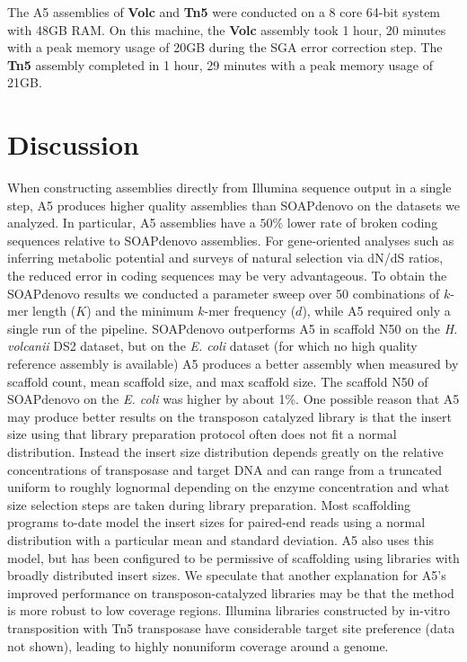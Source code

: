 \documentclass[10pt]{article}
\begin{document}
The A5 assemblies of \textbf{Volc} and \textbf{Tn5} were conducted on a 8 core 64-bit system with 48GB RAM. On this machine, the \textbf{Volc} assembly took 1 hour, 20 minutes with a peak memory usage of 20GB during the SGA error correction step. The \textbf{Tn5} assembly completed in 1 hour, 29 minutes with a peak memory usage of 21GB.

\section*{Discussion}

When constructing assemblies directly from Illumina sequence output in a single step, A5 produces higher quality assemblies 
than SOAPdenovo on the datasets we analyzed. 
In particular, A5 assemblies have a $50\%$ lower rate of broken coding sequences relative to SOAPdenovo assemblies.
For gene-oriented analyses such as inferring metabolic potential and surveys of natural selection via dN/dS ratios, the reduced error in coding sequences may be very advantageous.
 To obtain the SOAPdenovo results we conducted a parameter sweep 
over 50 combinations of $k$-mer length ($K$) and the minimum $k$-mer frequency ($d$), while A5 required
only a single run of the pipeline.
SOAPdenovo outperforms A5 in scaffold N50 on the \textit{H. volcanii} DS2 dataset, but on the \textit{E. coli} dataset 
(for which no high quality reference assembly is available) 
A5 produces a better assembly when measured by scaffold count, mean scaffold size, and max scaffold size. The scaffold N50 of 
SOAPdenovo on the \textit{E. coli} was higher by about 1\%.
One possible reason that A5 may produce better results on the transposon catalyzed library is that the insert size using
that library preparation protocol often does not fit a normal distribution.  Instead the insert size 
distribution depends greatly on the relative concentrations of transposase and target DNA and can range from a truncated uniform
to roughly lognormal depending on the enzyme concentration and what size selection steps are taken during library preparation.
Most scaffolding programs to-date model the insert sizes for paired-end reads using a normal distribution with a particular
mean and standard deviation. A5 also uses this model, but has been configured to be permissive of scaffolding
using libraries with broadly distributed insert sizes.  We speculate that another explanation for A5's improved performance on transposon-catalyzed 
libraries may be that the method is more robust to low coverage regions.  Illumina libraries constructed by in-vitro 
transposition with Tn5 transposase have considerable target site preference (data not shown), leading to highly nonuniform coverage around a genome.
\end{document}
